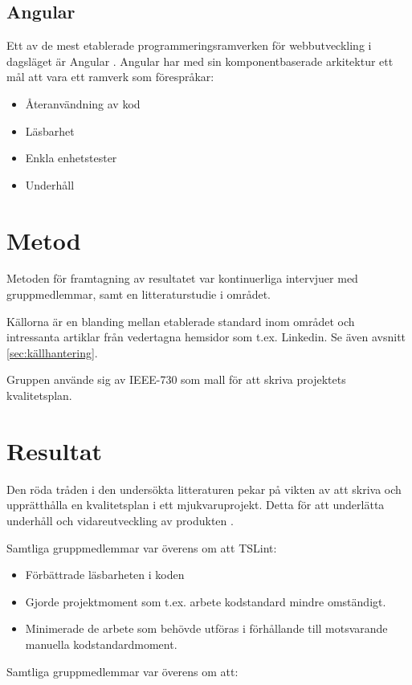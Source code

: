 \subsection{Angular}
Ett av de mest etablerade programmeringsramverken för webbutveckling i dagsläget är Angular \cite{altexsoft}. Angular har med sin komponentbaserade arkitektur ett mål att vara ett ramverk som förespråkar:

\begin{itemize}
	\item Återanvändning av kod
	\item Läsbarhet
	\item Enkla enhetstester
	\item Underhåll
\end{itemize}

\section{Metod}

Metoden för framtagning av resultatet var kontinuerliga intervjuer med gruppmedlemmar, samt en litteraturstudie i området.

Källorna är en blanding mellan etablerade standard inom området och intressanta artiklar från vedertagna hemsidor som t.ex. Linkedin. Se även avsnitt \ref{sec:källhantering}.

Gruppen använde sig av IEEE-730 som mall för att skriva projektets kvalitetsplan.

\section{Resultat}

Den röda tråden i den undersökta litteraturen pekar på vikten av att skriva och upprätthålla en kvalitetsplan i ett mjukvaruprojekt. Detta för att underlätta underhåll och vidareutveckling av produkten \cite{LCA}\cite{sustainable}\cite{ISOtor}\cite{altexsoft}. 

Samtliga gruppmedlemmar var överens om att TSLint:

\begin{itemize}
	\item Förbättrade läsbarheten i koden
	\item Gjorde projektmoment som t.ex. arbete kodstandard mindre omständigt.
	\item Minimerade de arbete som behövde utföras i förhållande till motsvarande manuella kodstandardmoment.
\end{itemize}
\clearpage
Samtliga gruppmedlemmar var överens om att:

